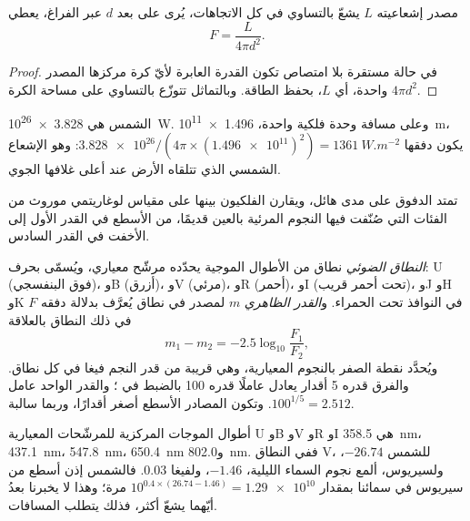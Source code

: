 \begin{proposition}\label{prop:b1:observing-the-sky:inverse-square}
مصدر إشعاعيته $L$ يشعّ بالتساوي في كل الاتجاهات، يُرى على بعد $d$ عبر الفراغ، يعطي 
\[
  F = \frac{L}{4\pi d^2} .
\]
\end{proposition}

\begin{proof}
في حالة مستقرة بلا امتصاص تكون القدرة العابرة لأيّ كرة مركزها المصدر واحدة، أي $L$، بحفظ الطاقة. وبالتماثل تتوزّع بالتساوي على مساحة الكرة $4\pi d^2$.
\end{proof}

\begin{example}
 الشمس هي \qty{3.828e26}{W}. وعلى مسافة وحدة فلكية واحدة، \qty{1.496e11}{m}، يكون دفقها $\num{3.828e26}/(4\pi\times
(\num{1.496e11})^2) = \qty{1361}{W.m^{-2}}$: وهو الإشعاع الشمسي الذي تتلقاه الأرض عند أعلى غلافها الجوي.
\end{example}

تمتد الدفوق على مدى هائل، ويقارن الفلكيون بينها على مقياس لوغاريتمي موروث من الفئات التي صُنّفت فيها النجوم المرئية بالعين قديمًا، من الأسطع في القدر الأول إلى الأخفت في القدر السادس.

\begin{definition}\label{def:b1:observing-the-sky:magnitude}
\emph{النطاق الضوئي} نطاق من الأطوال الموجية يحدّده مرشّح معياري، ويُسمّى بحرف: U (فوق البنفسجي)، وB (أزرق)، وV (مرئي)، وR (أحمر)، وI (تحت أحمر قريب)، وJ وH وK في النوافذ تحت الحمراء. و\emph{القدر الظاهري} $m$ لمصدر في نطاق يُعرَّف بدلالة دفقه $F$ في ذلك النطاق بالعلاقة
\[
  m_1 - m_2 = -2.5\log_{10}\frac{F_1}{F_2} ,
\]
ويُحدَّد نقطة الصفر بالنجوم المعيارية، وهي قريبة من قدر النجم فيغا في كل نطاق. والفرق قدره 5 أقدار يعادل عاملًا قدره 100 بالضبط في ؛ والقدر الواحد عامل $100^{1/5} = 2.512$. وتكون المصادر الأسطع أصغر أقدارًا، وربما سالبة.
\end{definition}

أطوال الموجات المركزية للمرشّحات المعيارية U وB وV وR وI هي
\qty{358.5}{nm}، \qty{437.1}{nm}، \qty{547.8}{nm}، \qty{650.4}{nm} و\qty{802.0}{nm}.
ففي النطاق V، للشمس  $-26.74$، ولسيريوس، ألمع نجوم السماء الليلية، $-1.46$، ولفيغا $0.03$. فالشمس إذن أسطع من سيريوس في سمائنا بمقدار $10^{0.4\times(26.74 - 1.46)} = \num{1.29e10}$ مرة؛ وهذا لا يخبرنا بعدُ أيّهما يشعّ أكثر، فذلك يتطلب المسافات.

